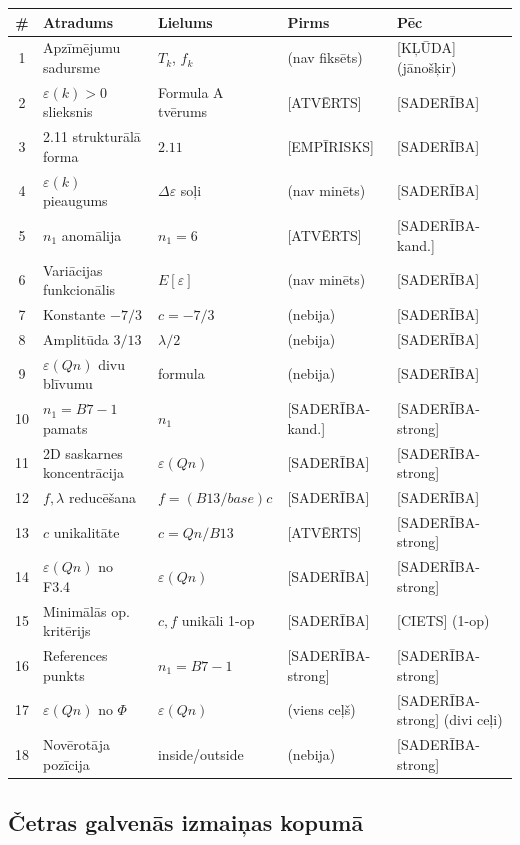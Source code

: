 \documentclass[12pt,a4paper]{article}
\begin{document}
\begin{longtable}{|c|l|l|l|l|}
\hline
\textbf{\#} & \textbf{Atradums} & \textbf{Lielums} & \textbf{Pirms} & \textbf{Pēc} \\
\hline
\endhead
1 & Apzīmējumu sadursme & $T_k$, $f_k$ & (nav fiksēts) & [KĻŪDA] (jānošķir) \\
\hline
2 & $\varepsilon(k)>0$ slieksnis & Formula A tvērums & [ATVĒRTS] & [SADERĪBA] \\
\hline
3 & 2.11 strukturālā forma & $2.11$ & [EMPĪRISKS] & [SADERĪBA] \\
\hline
4 & $\varepsilon(k)$ pieaugums & $\Delta\varepsilon$ soļi & (nav minēts) & [SADERĪBA] \\
\hline
5 & $n_1$ anomālija & $n_1 = 6$ & [ATVĒRTS] & [SADERĪBA-kand.] \\
\hline
6 & Variācijas funkcionālis & $E[\varepsilon]$ & (nav minēts) & [SADERĪBA] \\
\hline
7 & Konstante $-7/3$ & $c = -7/3$ & (nebija) & [SADERĪBA] \\
\hline
8 & Amplitūda $3/13$ & $\lambda/2$ & (nebija) & [SADERĪBA] \\
\hline
9 & $\varepsilon(Qn)$ divu blīvumu & formula & (nebija) & [SADERĪBA] \\
\hline
10 & $n_1=B7-1$ pamats & $n_1$ & [SADERĪBA-kand.] & [SADERĪBA-strong] \\
\hline
11 & 2D saskarnes koncentrācija & $\varepsilon(Qn)$ & [SADERĪBA] & [SADERĪBA-strong] \\
\hline
12 & $f,\lambda$ reducēšana & $f=(B13/base)c$ & [SADERĪBA] & [SADERĪBA] \\
\hline
13 & $c$ unikalitāte & $c=Qn/B13$ & [ATVĒRTS] & [SADERĪBA-strong] \\
\hline
14 & $\varepsilon(Qn)$ no F3.4 & $\varepsilon(Qn)$ & [SADERĪBA] & [SADERĪBA-strong] \\
\hline
15 & Minimālās op. kritērijs & $c,f$ unikāli 1-op & [SADERĪBA] & [CIETS] (1-op) \\
\hline
16 & References punkts & $n_1=B7-1$ & [SADERĪBA-strong] & [SADERĪBA-strong] \\
\hline
17 & $\varepsilon(Qn)$ no $\Phi$ & $\varepsilon(Qn)$ & (viens ceļš) & [SADERĪBA-strong] (divi ceļi) \\
\hline
18 & Novērotāja pozīcija & inside/outside & (nebija) & [SADERĪBA-strong] \\
\hline
\end{longtable}

\subsection*{Četras galvenās izmaiņas kopumā}
\end{document}

